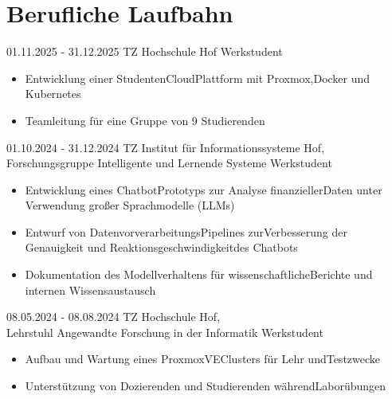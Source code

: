 \section{Berufliche Laufbahn}\label{sec:berufliche-laufbahn}
\jobentry
{01.11.2025 - 31.12.2025}
{TZ}
{Hochschule Hof\newline}
{Werkstudent}
{\vspace{-1\baselineskip}
    \begin{itemize}
        \item Entwicklung einer Studenten\-Cloud\-Plattform mit Proxmox,\newline Docker und Kubernetes
        \item Teamleitung für eine Gruppe von 9 Studierenden
    \end{itemize}
}
\jobentry
{01.10.2024 - 31.12.2024}
{TZ}
{Institut für Informationssysteme Hof, \\ Forschungsgruppe Intelligente und Lernende Systeme\newline}
{Werkstudent}
{\vspace{-1\baselineskip}
    \begin{itemize}
        \item Entwicklung eines Chatbot\-Prototyps zur Analyse finanzieller\newline Daten unter Verwendung großer Sprachmodelle (LLMs)
        \item Entwurf von Datenvorverarbeitungs\-Pipelines zur\newline Verbesserung der Genauigkeit und Reaktionsgeschwindigkeit\newline des Chatbots
        \item Dokumentation des Modellverhaltens für wissenschaftliche\newline Berichte und internen Wissensaustausch
    \end{itemize}
}
\jobentry
{08.05.2024 - 08.08.2024}
{TZ}
{Hochschule Hof, \\ Lehrstuhl Angewandte Forschung in der Informatik\newline}
{Werkstudent}
{\vspace{-1\baselineskip}
    \begin{itemize}
        \item Aufbau und Wartung eines Proxmox\-VE\-Clusters für Lehr\- und\newline Testzwecke
        \item Unterstützung von Dozierenden und Studierenden während\newline Laborübungen
    \end{itemize}
}
